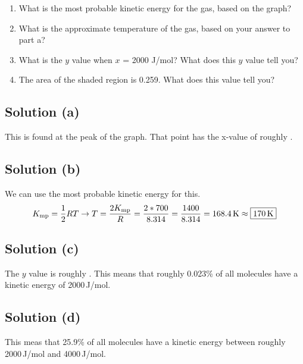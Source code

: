 \documentclass[10pt]{article}
\begin{document}
        \begin{enumerate} [label=\alph*)]
            \item What is the most probable kinetic energy for the gas, based on the graph?
            \item What is the approximate temperature of the gas, based on your answer to part a?
            \item What is the $y$ value when $x$ = 2000 J/mol? What does this $y$ value tell you?
            \item The area of the shaded region is 0.259. What does this value tell you?
        \end{enumerate}

        \subsection{Solution (a)}
            This is found at the peak of the graph.
            That point has the x-value of roughly . 

        \subsection{Solution (b)}
            We can use the most probable kinetic energy for this. 
            \begin{gather}
                K_{\rm mp} = \frac{1}{2} RT \to
                T   =   \frac{2K_{\rm mp}}{R}
                    =   \frac{2 * 700}{8.314}
                    =   \frac{1400}{8.314}
                    =   168.4\,\unit{\kelvin}
                    \approx \boxed{170\,\unit{\kelvin}}
            \end{gather}
        
        \subsection{Solution (c)}
            The $y$ value is roughly . 
            This means that roughly 0.023\% of all molecules have a kinetic energy of 2000\,\unit{\joule/\mole}. 
        
        \subsection{Solution (d)}
            This meas that 25.9\% of all molecules have a kinetic energy between roughly 2000\,\unit{\joule/\mole} and 4000\,\unit{\joule/\mole}. 
\end{document}
